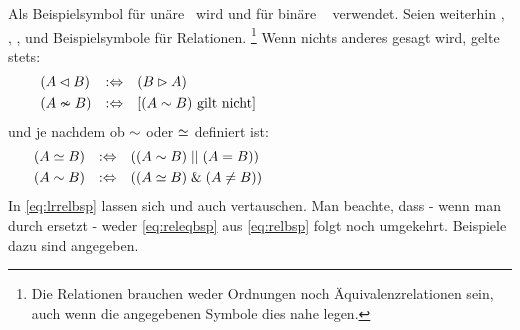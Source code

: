 Als Beispielsymbol für unäre \Operatoren\ wird \chrqt{$\opubsp$} und für binäre \Operatoren\ \chrqt{$\opbsp$} verwendet.
Seien weiterhin , , ,  und  Beispielsymbole für Relationen.%
\footnote{%
	Die Relationen brauchen weder Ordnungen noch Äquivalenzrelationen sein, auch wenn die angegebenen Symbole dies nahe legen.
}
Wenn nichts anderes gesagt wird, gelte stets:
%
\begin{align}
	& (A \lhd   B) & :\Leftrightarrow & \quad  (B \rhd   A)
	\label{eq:lrrelbsp}   \\
	& (A \nsim  B)  & :\Leftrightarrow & \quad [(A \sim   B) \text{ gilt nicht}]
	\label{eq:relnbsp}    &&&&&&&&&&&&&&&&&&&&&&&&&&&&&&
\end{align}
und je nachdem ob $\sim$ oder $\simeq$ definiert ist:
\begin{align}
	& (A \simeq  B) & :\Leftrightarrow & \quad ((A \sim   B) \;||\;  (A = B))
	\label{eq:releqbsp}   \\
	& (A \sim B)    & :\Leftrightarrow & \quad ((A \simeq B) \;\&\; (A \ne B))
	\label{eq:relbsp}    &&&&&&&&&&&&&&&&&&&&&&&&&&&&&&
\end{align}
%
In \eqref{eq:lrrelbsp} lassen sich \chrqt{$\lrelbsp$} und \chrqt{$\rrelbsp$} auch vertauschen.
Man beachte, dass - wenn man \chrqt{$\metadefeq$} durch \chrqt{$\metaequiv$} ersetzt - weder \eqref{eq:releqbsp} aus \eqref{eq:relbsp} folgt noch umgekehrt.
Beispiele dazu sind  angegeben.

